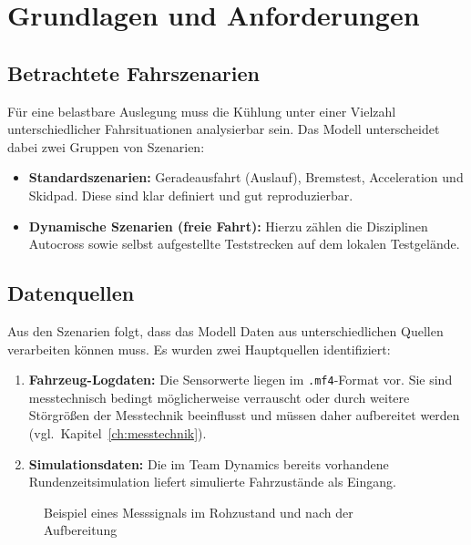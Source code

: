 \chapter{Grundlagen und Anforderungen}
\label{ch:Grundlagen und Anforderungen}

\section{Betrachtete Fahrszenarien}
\label{sec:fahrszenarien}

Für eine belastbare Auslegung muss die Kühlung unter einer Vielzahl
unterschiedlicher Fahrsituationen analysierbar sein. Das Modell unterscheidet
dabei zwei Gruppen von Szenarien:

\begin{itemize}
    \item \textbf{Standardszenarien:} Geradeausfahrt (Auslauf), Bremstest,
          Acceleration und Skidpad. Diese sind klar definiert und gut
          reproduzierbar.
    \item \textbf{Dynamische Szenarien (freie Fahrt):} Hierzu zählen die
          Disziplinen Autocross sowie selbst aufgestellte Teststrecken auf
          dem lokalen Testgelände.
\end{itemize}

\section{Datenquellen}
\label{sec:datenquellen}

Aus den Szenarien folgt, dass das Modell Daten aus unterschiedlichen Quellen
verarbeiten können muss. Es wurden zwei Hauptquellen identifiziert:

\begin{enumerate}
    \item \textbf{Fahrzeug-Logdaten:} Die Sensorwerte liegen im
          \texttt{.mf4}-Format vor. Sie sind messtechnisch bedingt
          möglicherweise verrauscht oder durch weitere Störgrößen der
          Messtechnik beeinflusst und müssen daher aufbereitet werden
          (vgl.~Kapitel~\ref{ch:messtechnik}).
    \item \textbf{Simulationsdaten:} Die im Team Dynamics bereits vorhandene
          Rundenzeitsimulation liefert simulierte Fahrzustände als Eingang.
\end{enumerate}

\begin{figure}[htbp]
    \centering
    \caption{Beispiel eines Messsignals im Rohzustand und nach der Aufbereitung}
    \label{fig:rohdaten_gefiltert}
\end{figure}

